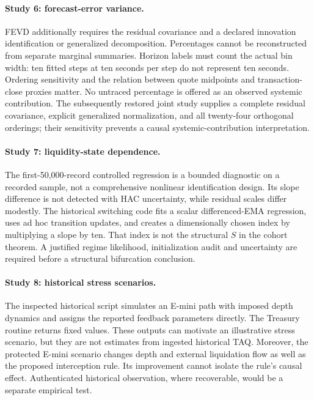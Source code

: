 \paragraph{Study 6: forecast-error variance.}
FEVD additionally requires the residual covariance and a declared innovation identification or generalized decomposition. Percentages cannot be reconstructed from separate marginal summaries. Horizon labels must count the actual bin width: ten fitted steps at ten seconds per step do not represent ten seconds. Ordering sensitivity and the relation between quote midpoints and transaction-close proxies matter. No untraced percentage is offered as an observed systemic contribution. The subsequently restored joint study supplies a complete residual covariance, explicit generalized normalization, and all twenty-four orthogonal orderings; their sensitivity prevents a causal systemic-contribution interpretation.

\paragraph{Study 7: liquidity-state dependence.}
The first-50,000-record controlled regression is a bounded diagnostic on a recorded sample, not a comprehensive nonlinear identification design. Its slope difference is not detected with HAC uncertainty, while residual scales differ modestly. The historical switching code fits a scalar differenced-EMA regression, uses ad hoc transition updates, and creates a dimensionally chosen index by multiplying a slope by ten. That index is not the structural $S$ in the cohort theorem. A justified regime likelihood, initialization audit and uncertainty are required before a structural bifurcation conclusion.

\paragraph{Study 8: historical stress scenarios.}
The inspected historical script simulates an E-mini path with imposed depth dynamics and assigns the reported feedback parameters directly. The Treasury routine returns fixed values. These outputs can motivate an illustrative stress scenario, but they are not estimates from ingested historical TAQ. Moreover, the protected E-mini scenario changes depth and external liquidation flow as well as the proposed interception rule. Its improvement cannot isolate the rule's causal effect. Authenticated historical observation, where recoverable, would be a separate empirical test.

